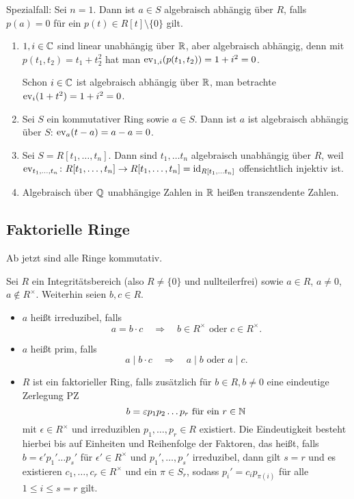 \documentclass[12pt,a4paper]{scrartcl}
\begin{document}
Spezialfall: Sei $n = 1$. Dann ist $a\in S$ algebraisch abhängig über $R$, falls $p(a) = 0$ für ein $p(t) \in R[t]\setminus\{0\}$ gilt.

\begin{bsp}
	\leavevmode
	\begin{enumerate}
		\item $1,i\in\mathbb C$ sind linear unabhängig über $\mathbb R$, aber algebraisch abhängig, denn mit $p(t_1,t_2) = t_1+t_2^2$ hat man $\operatorname{ev}_{1,i}(p(t_1,t_2)) = 1+i^2 = 0$.
		
		Schon $i\in \mathbb C$ ist algebraisch abhängig über $\mathbb R$, man betrachte $\operatorname{ev}_{i}(1+t^2) = 1+i^2  = 0$.
		\item Sei $S$ ein kommutativer Ring sowie $a\in S$. Dann ist $a$ ist algebraisch abhängig über $S$: $\operatorname{ev}_a(t-a) = a-a = 0$.
		\item Sei $S =R[t_1,\dots, t_n]$. Dann sind $t_1,\dots t_n$ algebraisch unabhängig über $R$, weil $\operatorname{ev}_{t_1,\dots, t_n}\colon R[t_1,\dots,t_n]\to R[t_1,\dots, t_n] = \operatorname{id}_{R[t_1,\dots t_n]}$ offensichtlich injektiv ist.
		\item Algebraisch über $\mathbb Q$ unabhängige Zahlen in $\mathbb R$ heißen transzendente Zahlen.
	\end{enumerate}
\end{bsp}

\subsection{Faktorielle Ringe}
Ab jetzt sind alle Ringe kommutativ.
\begin{defi} Sei $R$ ein Integritätsbereich (also $R\neq\{0\}$ und nullteilerfrei) sowie $a\in R$, $a\neq 0$, $a\notin R^{\times}$. Weiterhin seien $b,c \in R$.
\begin{itemize}
	\item $a$ heißt irreduzibel, falls \[a = b\cdot c\quad\Longrightarrow\quad \text{$b \in R^{\times}$ oder $c\in R^{\times}$}.\]
	\item $a$ heißt prim, falls \[a \mid b\cdot c\quad\Longrightarrow\quad \text{$a \mid b$ oder $a \mid c$}.\]
	\item $R$ ist ein faktorieller Ring, falls zusätzlich für $b\in R, b\neq 0$ eine eindeutige Zerlegung \glqq PZ\grqq{}
	\[b = \varepsilon p_1p_2\dots p_r \text{ für ein $r\in\mathbb N$}\]
	mit $\epsilon\in R^{\times}$ und irreduziblen $p_1,\dots, p_r\in R$ existiert. Die Eindeutigkeit besteht hierbei bis auf Einheiten und Reihenfolge der Faktoren, das heißt, falls $b = \epsilon'p_1'\dots p_s'$ für $\epsilon'\in R^{\times}$ und $p_1',\dots, p_s'$ irreduzibel, dann gilt $s = r$ und es existieren $c_1,\dots, c_r\in R^{\times}$ und ein $\pi \in S_r$, sodass $p_i' = c_ip_{\pi(i)}$ für alle $1 \le i \le s=r$ gilt.
\end{itemize}
\end{defi}
\end{document}
